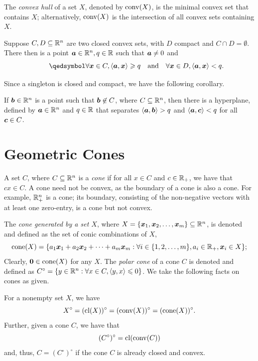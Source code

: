The {\em convex hull} of a set $X$, denoted by $\operatorname{conv}(X)$, is the minimal convex set that contains $X$; alternatively, $\operatorname{conv}(X)$ is the intersection of all convex sets containing $X$. 

\begin{proposition}\label{prop: strict hyperplane separation}
Suppose $C, D \subseteq \mathbb R^n$ are two closed convex sets, with $D$ compact and $C\cap D = \emptyset$. There then is a point ${\boldsymbol a}\in\mathbb R^n, q \in \mathbb R$ such that ${\boldsymbol a}\neq 0$ and 
\begin{equation*}\tag*{\qedsymbol} \forall \bmx\in C, \inner{\bma, \bmx} \geq q \quad\text{and}\quad\forall \bmx\in D, \inner{ \bma, \bmx } < q. \end{equation*}
\end{proposition}  
Since a singleton is closed and compact, we have the following corollary. 
\begin{corollary}
If ${\boldsymbol b}\in\mathbb R^n$ is a point such that ${\boldsymbol b}\not\in C$, where $C\subseteq \mathbb R^n$, then there is a hyperplane, defined by ${\boldsymbol a}\in\mathbb R^n$ and $q\in\mathbb R$ that separates $\left\langle{\boldsymbol a}, {\boldsymbol b}\right\rangle > q$ and $\left\langle{\boldsymbol a}, {\boldsymbol c}\right\rangle < q$ for all ${\boldsymbol c}\in C$. \hfill\qedsymbol
\end{corollary}


\section{Geometric Cones}

A set $C$, where $C\subseteq \mathbb R^n$ is a {\em cone} if for all $x\in C$ and $c\in\mathbb R_+$, we have that $cx\in C$. A cone need not be convex, as the boundary of a cone is also a cone. For example, $\mathbb R^n_+$ is a cone; its boundary, consisting of the non-negative vectors with at least one zero-entry, is a cone but not convex. 

The {\em cone generated by a set $X$}, where $X = \{{\boldsymbol x}_1, {\boldsymbol x}_2, \dots, {\boldsymbol x}_m\}\subseteq \mathbb R^n$, is denoted and defined as the set of conic combinations of $X$, 
\[ \operatorname{cone}(X) = 
	\{a_1{\boldsymbol x}_1 + a_2{\boldsymbol x}_2 + \dots + a_m {\boldsymbol x}_m: \forall 
			i\in\{1, 2, \dots, m\}, a_i\in\mathbb R_+, {\boldsymbol x}_i\in X
	\}; 
\]
Clearly, $\boldsymbol0\in\operatorname{cone}(X)$ for any $X$. The {\em polar cone} of a cone $C$ is denoted and defined as $C^\circ = \{y\in \mathbb R^n: \forall x\in C, \left\langle y, x\right\rangle\leqslant 0\}$. We take the following facts on cones as given. 
\begin{proposition}\label{thm: bipolar}
For a nonempty set $X$, we have 
\[ X^\circ = (\operatorname{cl}(X))^\circ = (\operatorname{conv}(X))^\circ = (\operatorname{cone}(X))^\circ.\]
Further, given a cone $C$, we have that 
\[ (C^\circ)^\circ = \operatorname{cl}(\operatorname{conv}(C)) \] 
and, thus, $C = (C^\circ)^\circ$ if the cone $C$ is already closed and convex. \hfill\qedsymbol
\end{proposition}

